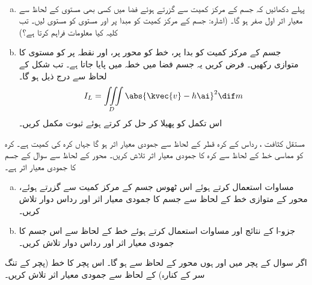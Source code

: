 \\
\begin{enumerate}[a.]
\item
پہلے دکھائیں کہ جسم کے مرکز کمیت سے گزرتے ہوئے  فضا میں کسی بھی مستوی کے لحاظ سے  معیار اثر اول صفر ہو گا۔ (اشارہ: جسم کے مرکز کمیت کو مبدا پر اور مستوی کو مستوی  لیں۔ تب کلیہ  کیا معلومات فراہم کرتا ہے؟)
\item
جسم کے مرکز کمیت کو بدا پر،  خط  کو محور  پر، اور نقطہ  پر   کو مستوی  کا متوازی رکھیں۔ فرض کریں یہ جسم  فضا میں خطہ  میں پایا جاتا ہے۔ تب شکل کے لحاظ سے  درج ذیل ہو گا۔
\begin{align}\label{مساوات_بالکثرت_مسئلہ_متوازی_محور_ب}
I_L=\iiint\limits_D \abs{\kvec{v}-h\ai}^2\dif m
\end{align}
اس تکمل کو   پھیلا   کر حل کر کرتے ہوئے ثبوت مکمل کریں۔
\end{enumerate}
مستقل کثافت  ، رداس  کے کرہ قطر کے لحاظ سے جمودی معیار اثر  ہو گا جہاں کرہ کی کمیت  ہے۔ کرہ کو مماسی خط کے لحاظ سے کرہ کا جمودی معیار اثر تلاش کریں۔
محور  کے لحاظ سے سوال  کے جسم کا جمودی معیار اثر  ہے۔
\begin{enumerate}[a.]
\item
مساوات  استعمال کرتے ہوئے اس ٹھوس جسم کے مرکز کمیت سے گزرتے ہوئے، محور  کے متوازی  خط کے لحاظ سے جسم  کا جمودی معیار اثر اور رداس دوار تلاش کریں۔
\item
جزو-ا کے نتائج اور مساوات  استعمال کرتے ہوئے  خط  کے لحاظ سے اس جسم کا جمودی معیار اثر اور رداس دوار تلاش کریں۔
\end{enumerate}

اگر سوال  کے پچر میں  اور  ہوں محور  کے لحاظ سے  ہو گا۔ اس پچر کا خط  (پچر کے  تنگ سر کے  کنارہ) کے لحاظ سے جمودی معیار اثر تلاش کریں۔

\\

